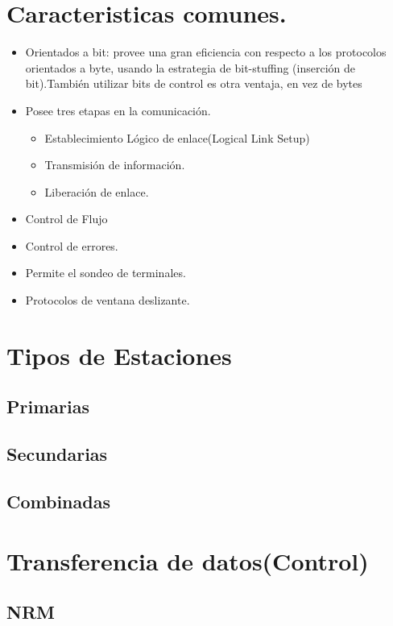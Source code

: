 \documentclass[12pt, fleqn]{report}                             %
\theoremstyle{break}                                            %
\begin{document}
        \section{Caracteristicas comunes.}
        \begin{itemize}
            \item Orientados a bit: provee una gran eficiencia con respecto a los protocolos orientados a byte,
usando la estrategia de bit-stuffing (inserción de bit).También utilizar bits de control es otra
ventaja, en vez de bytes
            \item Posee tres etapas en la comunicación.
            \begin{itemize}
                \item Establecimiento Lógico de enlace(Logical Link Setup)
                \item Transmisión de información.
                \item Liberación de enlace.
            \end{itemize}
            \item Control de Flujo
            \item Control de errores.
            \item Permite el sondeo de terminales.
            \item Protocolos de ventana deslizante.

        \end{itemize}


            \section{Tipos de Estaciones}
            \subsection{Primarias}
            \subsection{Secundarias}
            \subsection{Combinadas}
            \section{Transferencia de datos(Control)}
            \subsection{NRM}
\end{document}

